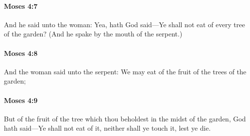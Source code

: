 		\paragraph{Moses 4:7} %
			\label{MOSES-4-7}

			And he said unto the woman: Yea, hath God said---Ye shall not eat of every tree of the garden? (And he spake by the mouth of the serpent.)


		\paragraph{Moses 4:8} %
			\label{MOSES-4-8}

			And the woman said unto the serpent: We may eat of the fruit of the trees of the garden;


		\paragraph{Moses 4:9} %
			\label{MOSES-4-9}

			But of the fruit of the tree which thou beholdest in the midst of the garden, God hath said---Ye shall not eat of it, neither shall ye touch it, lest ye die.



